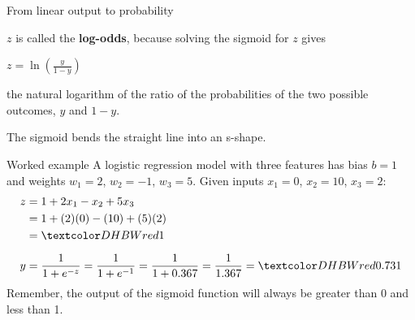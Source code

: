 \begin{frame}{From linear output to probability}
  \begin{withmargin}
    \begin{tdmargin}
      $z$ is called the \textbf{log-odds}, because solving the sigmoid for $z$
      gives
      \par\smallskip
      $z = \ln\left(\frac{y}{1-y}\right)$
      \par\smallskip
      the natural logarithm of the ratio of the probabilities of the two
      possible outcomes, $y$ and $1-y$.
      \par\medskip
      The sigmoid bends the straight line into an s-shape.
    \end{tdmargin}
  \end{withmargin}
\end{frame}

\begin{frame}{Worked example}
  \small
  A logistic regression model with three features has bias $b = 1$ and weights
  $w_1 = 2$, $w_2 = -1$, $w_3 = 5$. Given inputs $x_1 = 0$, $x_2 = 10$,
  $x_3 = 2$:
  \begin{align*}
    z &= 1 + 2x_1 - x_2 + 5x_3\\
      &= 1 + (2)(0) - (10) + (5)(2)\\
      &= \gterm{1}\\[0.6em]
    y &= \frac{1}{1 + e^{-z}} = \frac{1}{1 + e^{-1}} = \frac{1}{1 + 0.367}
       = \frac{1}{1.367} = \gterm{0.731}
  \end{align*}
  \footnotesize
  Remember, the output of the sigmoid function will always be greater than 0 and
  less than 1.
\end{frame}

